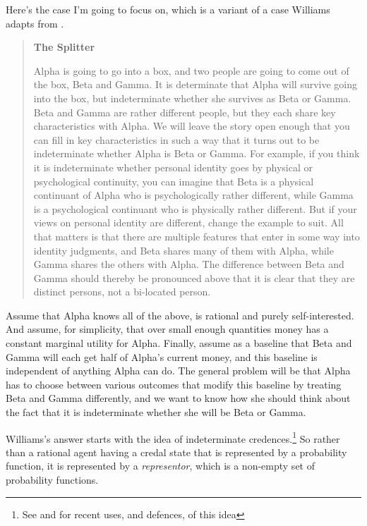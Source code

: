 Here's the case I'm going to focus on, which is a variant of a case Williams adapts from \citet{vanInwagen1990}.

\begin{quote}

\textbf{The Splitter}

Alpha is going to go into a box, and two people are going to come out of the box, Beta and Gamma. It is determinate that Alpha will survive going into the box, but indeterminate whether she survives as Beta or Gamma. Beta and Gamma are rather different people, but they each share key characteristics with Alpha. We will leave the story open enough that you can fill in key characteristics in such a way that it turns out to be indeterminate whether Alpha is Beta or Gamma. For example, if you think it is indeterminate whether personal identity goes by physical or psychological continuity, you can imagine that Beta is a physical continuant of Alpha who is psychologically rather different, while Gamma is a psychological continuant who is physically rather different. But if your views on personal identity are different, change the example to suit. All that matters is that there are multiple features that enter in some way into identity judgments, and Beta shares many of them with Alpha, while Gamma shares the others with Alpha. The difference between Beta and Gamma should thereby be pronounced above that it is clear that they are distinct persons, not a bi-located person. 

\end{quote}

\noindent Assume that Alpha knows all of the above, is rational and purely self-interested. And assume, for simplicity, that over small enough quantities money has a constant marginal utility for Alpha. Finally, assume as a baseline that Beta and Gamma will each get half of Alpha's current money, and this baseline is independent of anything Alpha can do. The general problem will be that Alpha has to choose between various outcomes that modify this baseline by treating Beta and Gamma differently, and we want to know how she should think about the fact that it is indeterminate whether she will be Beta or Gamma.

Williams's answer starts with the idea of indeterminate credences.\footnote{See \citet{Joyce2010} and \citet{Schoenfield2012} for recent uses, and defences, of this idea} So rather than a rational agent having a credal state that is represented by a probability function, it is represented by a \textit{representor}, which is a non-empty set of probability functions. 

